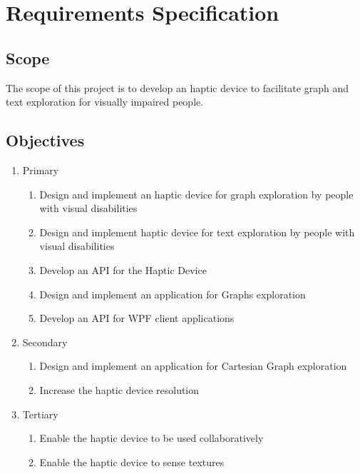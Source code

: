 \chapter*{Requirements Specification}

\section*{Scope}

The scope of this project is to develop an haptic device to facilitate graph and text exploration for visually impaired people. 

\section*{Objectives}

\begin{enumerate}
	\item Primary
    \begin{enumerate}
    	\item Design and implement an haptic device for graph exploration by people with visual disabilities
        \item Design and implement haptic device for text exploration by people with visual disabilities
        \item Develop an API for the Haptic Device
        \item Design and implement an application for Graphs exploration
        \item Develop an API for WPF client applications
    \end{enumerate}
    \item Secondary
    \begin{enumerate}
    	\item Design and implement an application for Cartesian Graph exploration
        \item Increase the haptic device resolution
    \end{enumerate}
    \item Tertiary
    \begin{enumerate}
    	\item Enable the haptic device to be used collaboratively
        \item Enable the haptic device to sense textures
    \end{enumerate}
\end{enumerate}

